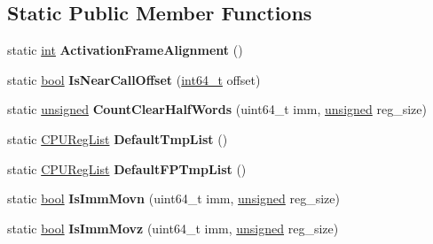 \subsection*{Static Public Member Functions}
\begin{DoxyCompactItemize}
\item 
\mbox{\label{classv8_1_1internal_1_1TurboAssembler_aef72dcc951f72f29d67bb7cb34378214}} 
static \mbox{\hyperlink{classint}{int}} {\bfseries Activation\+Frame\+Alignment} ()
\item 
\mbox{\label{classv8_1_1internal_1_1TurboAssembler_a0085e39d44fd43db69059350baa9e8c4}} 
static \mbox{\hyperlink{classbool}{bool}} {\bfseries Is\+Near\+Call\+Offset} (\mbox{\hyperlink{classint64__t}{int64\+\_\+t}} offset)
\item 
\mbox{\label{classv8_1_1internal_1_1TurboAssembler_a909babb5d08b1b17e652378e43067144}} 
static \mbox{\hyperlink{classunsigned}{unsigned}} {\bfseries Count\+Clear\+Half\+Words} (uint64\+\_\+t imm, \mbox{\hyperlink{classunsigned}{unsigned}} reg\+\_\+size)
\item 
\mbox{\label{classv8_1_1internal_1_1TurboAssembler_a84721b565a3dcdd7ea0d9b0f70e5c53b}} 
static \mbox{\hyperlink{classv8_1_1internal_1_1CPURegList}{C\+P\+U\+Reg\+List}} {\bfseries Default\+Tmp\+List} ()
\item 
\mbox{\label{classv8_1_1internal_1_1TurboAssembler_a6f8929f7a6cf27c7700b163a3831615a}} 
static \mbox{\hyperlink{classv8_1_1internal_1_1CPURegList}{C\+P\+U\+Reg\+List}} {\bfseries Default\+F\+P\+Tmp\+List} ()
\item 
\mbox{\label{classv8_1_1internal_1_1TurboAssembler_a64dac2da64fb92aff9157c9e3f800516}} 
static \mbox{\hyperlink{classbool}{bool}} {\bfseries Is\+Imm\+Movn} (uint64\+\_\+t imm, \mbox{\hyperlink{classunsigned}{unsigned}} reg\+\_\+size)
\item 
\mbox{\label{classv8_1_1internal_1_1TurboAssembler_a2ce06c2334ca1d91014276c6523617b0}} 
static \mbox{\hyperlink{classbool}{bool}} {\bfseries Is\+Imm\+Movz} (uint64\+\_\+t imm, \mbox{\hyperlink{classunsigned}{unsigned}} reg\+\_\+size)

\end{DoxyCompactItemize}
